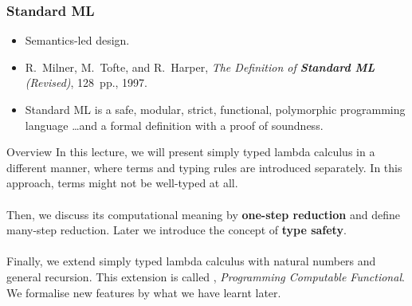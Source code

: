 \begin{frame}[c]
  \frametitle{\protect\textbf{Standard ML}}
  \begin{itemize}
    \item Semantics-led design.
    \item R.\ Milner, M.\ Tofte, and R.\ Harper, \emph{The Definition of
        \textbf{Standard ML} (Revised)}, \alert{128~pp.}, 1997. \\
    \item Standard ML is a safe, modular, strict, functional, polymorphic
      programming language \dots and \alert{a formal definition with a proof of
        soundness}.
  \end{itemize}
\end{frame}

\begin{frame}{Overview}
  In this lecture, we will present simply typed lambda calculus 
  in a different manner, where terms and typing rules are introduced
  separately. In this approach, terms might not be well-typed at all.
  \\~\\

  Then, we discuss its computational meaning by \textbf{one-step reduction} and
  define many-step reduction.  Later we introduce the concept of
  \textbf{type safety}. 
  \\~\\

  Finally, we extend simply typed lambda calculus with natural numbers
  and general recursion. This extension is called \PCF{}, \emph{Programming
    Computable Functional}. We formalise new features
  by what we have learnt later.
\end{frame}

